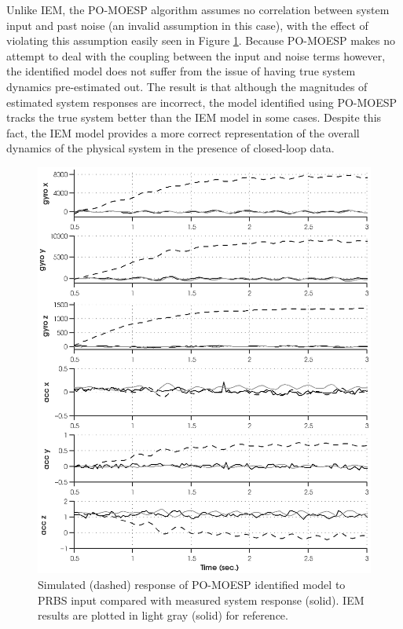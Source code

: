 Unlike IEM, the PO-MOESP algorithm assumes no correlation between system input and past noise (an invalid assumption in this case), with the effect of violating this assumption easily seen in Figure \ref{sim_1760_moesp.eps}. Because PO-MOESP makes no attempt to deal with the coupling between the input and noise terms however, the identified model does not suffer from the issue of having true system dynamics pre-estimated out. The result is that although the magnitudes of estimated system responses are incorrect, the model identified using PO-MOESP tracks the true system better than the IEM model in some cases. Despite this fact, the IEM model provides a more correct representation of the overall dynamics of the physical system in the presence of closed-loop data.

\newpage
\begin{figure}[htb!]
	\centering
	\includegraphics{../fig/sim_1760_moesp.eps}
	\caption{Simulated (dashed) response of PO-MOESP identified model to PRBS input compared with measured system response (solid). IEM results are plotted in light gray (solid) for reference.}
	\label{sim_1760_moesp.eps}
\end{figure}\clearpage











